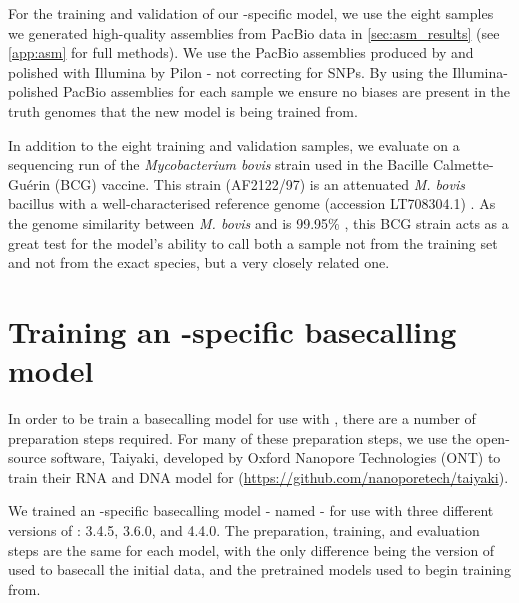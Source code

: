 For the training and validation of our \mtb{}-specific model, we use the eight samples we generated high-quality assemblies from PacBio data in \autoref{sec:asm_results} (see \autoref{app:asm} for full methods). We use the PacBio assemblies produced by \flye{} and polished with Illumina by Pilon - not correcting for SNPs. By using the Illumina-polished PacBio assemblies for each sample we ensure no \ont{} biases are present in the truth genomes that the new model is being trained from.

In addition to the eight training and validation samples, we evaluate on a \ont{} sequencing run of the \textit{Mycobacterium bovis} strain used in the Bacille Calmette-Guérin (BCG) vaccine. This strain (AF2122/97) is an attenuated \textit{M. bovis} bacillus \cite{luca2013} with a well-characterised reference genome (accession LT708304.1) \cite{Malone2017}. As the genome similarity between \textit{M. bovis} and \mtb{} is 99.95\% \cite{Kanipe2020}, this BCG strain acts as a great test for the model's ability to call both a sample not from the training set and not from the exact species, but a very closely related one.


\section{Training an \mtb{}-specific \ont{} basecalling model}

In order to be train a basecalling model for use with \guppy{}, there are a number of preparation steps required. For many of these preparation steps, we use the open-source software, Taiyaki, developed by Oxford Nanopore Technologies (ONT) to train their RNA and DNA model for \guppy{} (\url{https://github.com/nanoporetech/taiyaki}).

We trained an \mtb{}-specific basecalling model - named \tubby{} - for use with three different versions of \guppy{}: 3.4.5, 3.6.0, and 4.4.0. The preparation, training, and evaluation steps are the same for each model, with the only difference being the version of \guppy{} used to basecall the initial data, and the pretrained models used to begin training from.

